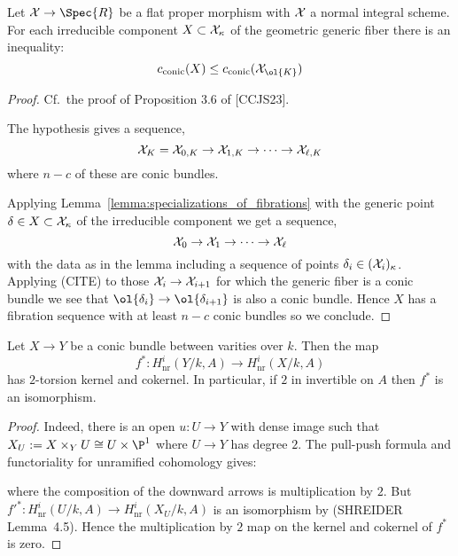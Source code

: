 \documentclass[12pt]{article}
\theoremstyle{plain}
\begin{document}
\begin{prop}
Let $\X \to \Spec{R}$ be a flat proper morphism with $\mathcal{X}$ a normal integral scheme. For each irreducible component $X \subset \mathcal{X}_{\kappa}$ of the geometric generic fiber there is an inequality:
\[ c_{\text{conic}}(X) \le c_{\text{conic}}(\X_{\ol{K}}) \]
\end{prop}

\begin{proof}
Cf.\ the proof of Proposition 3.6 of [CCJS23]. 

The hypothesis gives a sequence,
\[ \mathcal{X}_K = \mathcal{X}_{0,K} \to \mathcal{X}_{1,K} \to \cdots \to \mathcal{X}_{\ell,K} \]
where $n-c$ of these are conic bundles. 

Applying Lemma~\ref{lemma:specializations_of_fibrations}
with the generic point $\delta \in X \subset \mathcal{X}_{\kappa}$ of the irreducible component we get a sequence,
\[ \mathcal{X}_0 \to \mathcal{X}_1 \to \cdots \to \mathcal{X}_\ell \]
with the data as in the lemma including a sequence of points $\delta_i \in (\mathcal{X}_i)_{\kappa}$. Applying (CITE) to those $\mathcal{X}_i \to \mathcal{X}_{i+1}$ for which the generic fiber is a conic bundle we see that $\ol{\delta_i} \to \ol{\delta_{i+1}}$ is also a conic bundle. Hence $X$ has a fibration sequence with at least $n - c$ conic bundles so we conclude. 
\end{proof}

\newcommand{\nr}{\mathrm{nr}}


\begin{prop}
Let $X \to Y$ be a conic bundle between varities over $k$. Then the map
\[ f^* : H_{\nr}^i(Y/k, A) \to H_{\nr}^i(X/k, A) \]
has $2$-torsion kernel and cokernel. In particular, if $2$ in invertible on $A$ then $f^*$ is an isomorphism. 
\end{prop}

\begin{proof}
Indeed, there is an \etale open $u : U \to Y$ with dense image such that $X_U := X \times_Y U \cong U \times \P^1$ where $U \to Y$ has degree $2$. The pull-push formula and functoriality for unramified cohomology gives:
\begin{center}
\end{center}
where the composition of the downward arrows is multiplication by $2$.
But $f'^* : H^i_{\nr}(U/k, A) \to H^i_{\nr}(X_U/k, A)$ is an isomorphism by (SHREIDER Lemma~4.5). Hence the multiplication by $2$ map on the kernel and cokernel of $f^*$ is zero. 
\end{proof}
\end{document}
